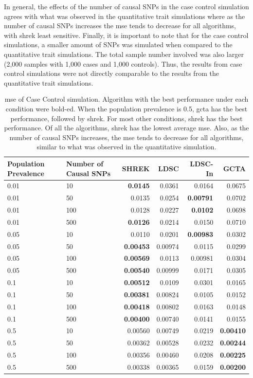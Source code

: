 		In general, the effects of the number of causal \glspl{SNP} in the case control simulation agrees with what was observed in the quantitative trait simulations where as the number of causal \glspl{SNP} increases the \gls{mse} tends to decrease for all algorithms, with \gls{shrek} least sensitive.
		Finally, it is important to note that for the case control simulations, a smaller amount of \glspl{SNP} was simulated when compared to the quantitative trait simulations. 
		The total sample number involved was also larger (2,000 samples with 1,000 cases and 1,000 controls).
		Thus, the results from case control simulations were not directly comparable to the results from the quantitative trait simulations.
		\begin{table}
			\centering
			\begin{tabular}{p{2cm}p{2.4cm}rrrr}
				\toprule
				Population Prevalence&	Number of Causal SNPs&	SHREK&	LDSC&	LDSC-In&	GCTA \\
				\midrule
				0.01&	10&	\textbf{0.0145}&	0.0361&	0.0164&	0.0675\\
				0.01&	50&	0.0135&	0.0254&	\textbf{0.00791}&	0.0702\\
				0.01&	100&	0.0128&	0.0227&	\textbf{0.0102}&	0.0698\\
				0.01&	500&	\textbf{0.0126}&	0.0214&	0.0150&	0.0710\\
				0.05&	10&	0.0110&	0.0201&	\textbf{0.00983}&	0.0302\\
				0.05&	50&	\textbf{0.00453}&	0.00974&	0.0115&	0.0299\\
				0.05&	100&	\textbf{0.00569}&	0.0113&	0.00981&	0.0304\\
				0.05&	500&	\textbf{0.00540}&	0.00999&	0.0171&	0.0305\\
				0.1&	10&	\textbf{0.00512}&	0.0109&	0.0301&	0.0165\\
				0.1&	50&	\textbf{0.00381}&	0.00824&	0.0105&	0.0152\\
				0.1&	100&	\textbf{0.00418}&	0.00802&	0.0163&	0.0148\\
				0.1&	500&	\textbf{0.00400}&	0.00740&	0.0141&	0.0155\\
				0.5&	10&	0.00560&	0.00749&	0.0219&	\textbf{0.00410}\\
				0.5&	50&	0.00362&	0.00528&	0.0232&	\textbf{0.00244}\\
				0.5&	100&	0.00356&	0.00460&	0.0208&	\textbf{0.00225}\\
				0.5&	500&	0.00338&	0.00365&	0.0159&	\textbf{0.00200}\\
				\bottomrule
			\end{tabular}
			\caption[MSE of Case Control Simulation]{
				\Gls{mse} of Case Control simulation.
				Algorithm with the best performance under each condition were bold-ed.
				When the population prevalence is 0.5, \gls{gcta} has the best performance, followed by \gls{shrek}.
				For most other conditions, \gls{shrek} has the best performance. 
				Of all the algorithms, \gls{shrek} has the lowest average \gls{mse}.
				Also, as the number of causal \glspl{SNP} increases, the \gls{mse} tends to decrease for all algorithms, similar to what was observed in the quantitative simulation. 
			}
			\label{tab:mseCC}
		\end{table}
